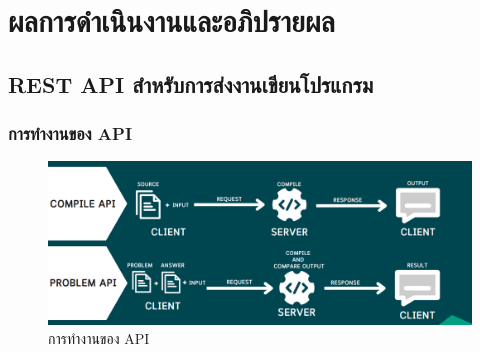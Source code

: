 \chapter{ผลการดำเนินงานและอภิปรายผล}
\label{chapter4}

\section{REST API สำหรับการส่งงานเขียนโปรแกรม}

\subsection{การทำงานของ API}
        \begin{figure}[H]
            \centering
                \centering
                \includegraphics[width=5in]{latex/figures/api_work.png}
            \caption{การทำงานของ API}
        \end{figure}

